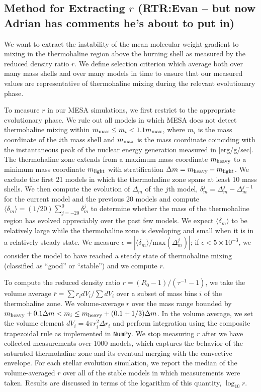 \subsection{Method for Extracting $r$ \textbf{(RTR:Evan -- but now Adrian has comments he's about to put in)}}
We want to extract the instability of the mean molecular weight gradient to mixing in the thermohaline region above the burning shell as measured by the reduced density ratio $r$.
We define selection criterion which average both over many mass shells and over many models in time to ensure that our measured values are representative of thermohaline mixing during the relevant evolutionary phase.

To measure $r$ in our MESA simulations, we first restrict to the appropriate evolutionary phase.
We rule out all models in which MESA does not detect thermohaline mixing within $m_{\rm max} \leq m_i < 1.1 m_{\rm max}$, where $m_i$ is the mass coordinate of the $i$th mass shell and $m_{\rm max}$ is the mass coordinate coinciding with the instantaneous peak of the nuclear energy generation measured in [erg/g/sec].
The thermohaline zone extends from a maximum mass coordinate $m_{\rm heavy}$ to a minimum mass coordinate $m_{\rm light}$ with stratification $\Delta m = m_{\rm heavy} - m_{\rm light}$.
We exclude the first 21 models in which the thermohaline zone spans at least 10 mass shells.
We then compute the evolution of $\Delta_{m}$ of the $j$th model, $\delta_m^j = \Delta_m^{j} - \Delta_m^{j-1}$ for the current model and the previous 20 models and compute $\langle \delta_m \rangle = (1/20)\sum_{j=-20}^0 \delta_m^j$ to determine whether the mass of the thermohaline region has evolved appreciably over the past few models. We expect $\langle \delta_m \rangle$ to be relatively large while the thermohaline zone is developing and small when it is in a relatively steady state.
We measure $\epsilon = |\langle \delta_m \rangle / \mathrm{max}(\Delta_m^j)|$; if $\epsilon < 5 \times 10^{-3}$, we consider the model to have reached a steady state of thermohaline mixing (classified as ``good'' or ``stable'') and we compute $r$.

To compute the reduced density ratio $r = (R_0 - 1)/(\tau^{-1} - 1)$, we take the volume average $\bar{r} = \sum r_i dV_i / \sum dV_i$ over a subset of mass bins $i$ of the thermohaline zone.
We volume-average $r$ over the mass range bounded by $m_{\rm{heavy}} + 0.1\Delta m  < m_i \leq m_{\rm heavy} + (0.1 + 1/3)\Delta m$.
In the volume average, we set the volume element $dV_i = 4\pi r_i^2 \Delta r_i$ and perform integration using the composite trapezoidal rule as implemented in \texttt{NumPy}.
We stop measuring $r$ after we have collected measurements over 1000 models, which captures the behavior of the saturated thermohaline zone and its eventual merging with the convective envelope.
For each stellar evolution simulation, we report the median of the volume-averaged $r$ over all of the stable models in which measurements were taken. 
Results are discussed in terms of the logarithm of this quantity, $\log_{10} r$.